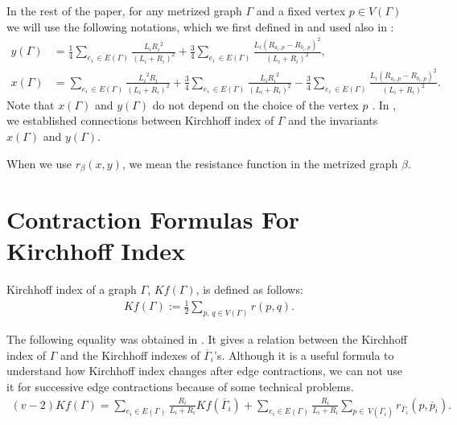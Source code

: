 \documentclass[12pt]{amsart}
\theoremstyle{example}
\theoremstyle{definition}
\theoremstyle{notation}
\begin{document}
In the rest of the paper, for any metrized graph ${\Gamma}$ and a fixed vertex $p \in {V({\Gamma})}$ we will use the following notations, which we first defined in \cite{C7} and used also in \cite{C6}:
\begin{equation}\label{eqn definition of x and y}
\begin{split}
y({\Gamma})&=\frac{1}{4}\sum_{e_i \, \in {E({\Gamma})}}\frac{{L_{i}}
{R_{i}}^2}{({L_{i}}+{R_{i}})^2}+\frac{3}{4}\sum_{e_i \, \in {E({\Gamma})}}\frac{{L_{i}}
(R_{a_i,p}-R_{b_i,p})^2}{({L_{i}}+{R_{i}})^2},
\\x({\Gamma})&=\sum_{e_i \, \in
{E({\Gamma})}}\frac{{L_{i}}^2{R_{i}}}{({L_{i}}+{R_{i}})^2} +\frac{3}{4}\sum_{e_i \, \in
{E({\Gamma})}}\frac{{L_{i}} {R_{i}}^2}{({L_{i}}+{R_{i}})^2}
-\frac{3}{4}\sum_{e_i \, \in {E({\Gamma})}}\frac{{L_{i}}
(R_{a_i,p}-R_{b_i,p})^2}{({L_{i}}+{R_{i}})^2}.
\end{split}
\end{equation}
Note that $x({\Gamma})$ and $y({\Gamma})$ do not depend on the choice of the vertex $p$ \cite[Lemma 2.11]{C2}.
In \cite{C6}, we established connections between Kirchhoff index of ${\Gamma}$ and the invariants $x({\Gamma})$ and $y({\Gamma})$.

When we use $r_{\beta}(x,y)$, we mean the resistance function in the metrized graph $\beta$.

\section{Contraction Formulas For Kirchhoff Index}\label{sec contraction}

Kirchhoff index of a graph ${\Gamma}$, $Kf({\Gamma})$, is defined \cite{KR} as follows:
\begin{equation}\label{eqn KIndex definition}
\begin{split}
Kf({\Gamma}):=\frac{1}{2}\sum_{p,\, q \in {V({\Gamma})}}r(p,q).
\end{split}
\end{equation}

The following equality was obtained in \cite[page 4038]{C6}. It gives a relation between the Kirchhoff index of ${\Gamma}$ and the Kirchhoff indexes of ${{\overline{\Gamma}}}_i$'s. Although it is a useful formula to understand how Kirchhoff index changes after edge contractions, we can not use it for successive edge contractions because of some technical problems.
\begin{equation}\label{eqn kirchhoff contraction1}
\begin{split}
(v-2)Kf({\Gamma})=\sum_{e_i \in {E({\Gamma})}} \frac{R_{i}}{{L_{i}}+{R_{i}}} Kf({{\overline{\Gamma}}}_i)+\sum_{e_i \in {E({\Gamma})}} \frac{R_{i}}{{L_{i}}+{R_{i}}}\sum_{p \in \, {V({{{\overline{\Gamma}}}_i})}} r_{{{\overline{\Gamma}}}_i}(p,{\overline{p}_i}).
\end{split}
\end{equation}
\end{document}
